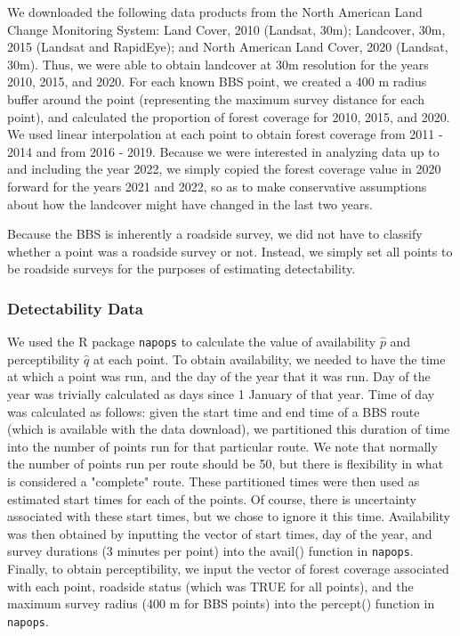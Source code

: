 \documentclass[12pt]{article}
\begin{document}
\par We downloaded the following data products from the North American Land Change Monitoring System: Land Cover, 2010 (Landsat, 30m); Landcover, 30m, 2015 (Landsat and RapidEye); and North American Land Cover, 2020 (Landsat, 30m).
Thus, we were able to obtain landcover at 30m resolution for the years 2010, 2015, and 2020. 
For each known BBS point, we created a 400 m radius buffer around the point (representing the maximum survey distance for each point), and calculated the proportion of forest coverage for 2010, 2015, and 2020. 
We used linear interpolation at each point to obtain forest coverage from 2011 - 2014 and from 2016 - 2019. 
Because we were interested in analyzing data up to and including the year 2022, we simply copied the forest coverage value in 2020 forward for the years 2021 and 2022, so as to make conservative assumptions about how the landcover might have changed in the last two years.

\par Because the BBS is inherently a roadside survey, we did not have to classify whether a point was a roadside survey or not.
Instead, we simply set all points to be roadside surveys for the purposes of estimating detectability.

\subsubsection{Detectability Data}

\par We used the R package \texttt{napops} to calculate the value of availability $\hat{p}$ and perceptibility $\hat{q}$ at each point.
To obtain availability, we needed to have the time at which a point was run, and the day of the year that it was run.
Day of the year was trivially calculated as days since 1 January of that year.
Time of day was calculated as follows: given the start time and end time of a BBS route (which is available with the data download), we partitioned this duration of time into the number of points run for that particular route.
We note that normally the number of points run per route should be 50, but there is flexibility in what is considered a "complete" route.
These partitioned times were then used as estimated start times for each of the points. 
Of course, there is uncertainty associated with these start times, but we chose to ignore it this time.
Availability was then obtained by inputting the vector of start times, day of the year, and survey durations (3 minutes per point) into the avail() function in \texttt{napops}.
Finally, to obtain perceptibility, we input the vector of forest coverage associated with each point, roadside status (which was TRUE for all points), and the maximum survey radius (400 m for BBS points) into the percept() function in \texttt{napops}.
\end{document}
